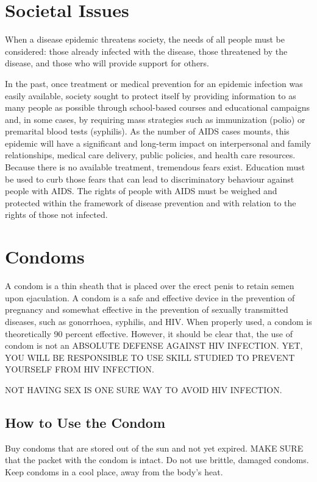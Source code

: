 \section{Societal Issues}

When a disease epidemic threatens society, the needs of all people must be considered:
those already infected with the disease, those threatened by the disease, and those who will
provide support for others.

In the past, once treatment or medical prevention for an epidemic infection was easily
available, society sought to protect itself by providing information to as many people as
possible through school-based courses and educational campaigns and, in some cases, by
requiring mass strategies such as immunization (polio) or premarital blood tests (syphilis). As
the number of AIDS cases mounts, this epidemic will have a significant and long-term impact
on interpersonal and family relationships, medical care delivery, public policies, and health care resources. Because there is no available treatment, tremendous fears exist. Education
must be used to curb those fears that can lead to discriminatory behaviour against people
with AIDS. The rights of people with AIDS must be weighed and protected within the
framework of disease prevention and with relation to the rights of those not infected.

\section{Condoms} 
\label{sec:condoms}

A condom is a thin sheath that is placed over the erect penis to retain semen upon
ejaculation. A condom is a safe and effective device in the prevention of pregnancy and
somewhat effective in the prevention of sexually transmitted diseases, such as gonorrhoea,
syphilis, and HIV. When properly used, a condom is theoretically 90 percent effective.
However, it should be clear that, the use of condom is not an ABSOLUTE DEFENSE
AGAINST HIV INFECTION. YET, YOU WILL BE RESPONSIBLE TO USE SKILL STUDIED
TO PREVENT YOURSELF FROM HIV INFECTION.

NOT HAVING SEX IS ONE SURE WAY TO AVOID HIV INFECTION.

\subsection{How to Use the Condom}

Buy condoms that are stored out of the sun and not yet expired. MAKE SURE that the packet
with the condom is intact. Do not use brittle, damaged condoms. Keep condoms in a cool
place, away from the body's heat.


